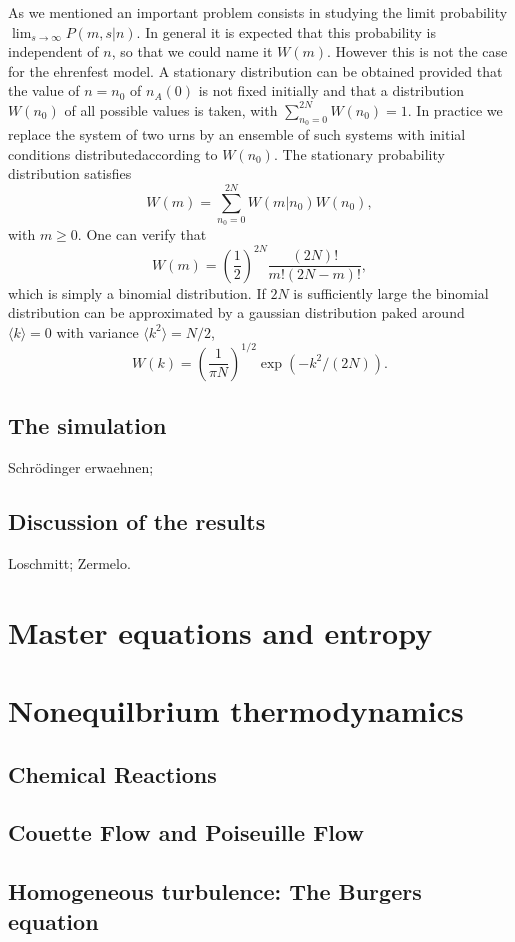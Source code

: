As we mentioned an important problem consists in studying the limit
probability $\lim_{s \rightarrow \infty} P(m,s|n)$. In general it is expected
that this probability is independent of $n$, so that we could name it $W(m)$.
However this is not the case for the ehrenfest model. A stationary
distribution can be obtained provided that the value of $n=n_0$ of $n_A(0)$ is
not fixed initially and that a distribution $W(n_0)$ of all possible values is
taken, with $\sum_{n_0=0}^{2N} W(n_0) = 1$. In practice we replace the system
of two urns by an ensemble of such systems with initial conditions
distributedaccording to $W(n_0)$. The stationary probability distribution 
satisfies
\begin{displaymath}
  W(m) = \sum_{n_0 = 0}^{2N} W(m|n_0) W(n_0),
\end{displaymath}
with $m \ge 0$. One can verify that
\begin{displaymath}
  W(m) = \left( \frac{1}{2} \right)^{2N} \frac{(2N)!}{m! (2N -m)!},
\end{displaymath}
which is simply a binomial distribution. If $2N$ is sufficiently large the
binomial distribution can be approximated by a gaussian distribution paked
around $\langle k \rangle =0$ with variance $\langle k^2 \rangle = N/2$,
\begin{displaymath}
  W(k) = \left( \frac{1}{\pi N} \right)^{1/2} \exp(-k^2/(2N)). 
\end{displaymath}


\subsection{The simulation}
Schr\"odinger erwaehnen;
\subsection{Discussion of the results}
Loschmitt; Zermelo.









\section{Master equations and entropy}


\section{Nonequilbrium thermodynamics}
\subsection{Chemical Reactions}
\subsection{Couette Flow and Poiseuille Flow}
\subsection{Homogeneous turbulence: The Burgers equation}

